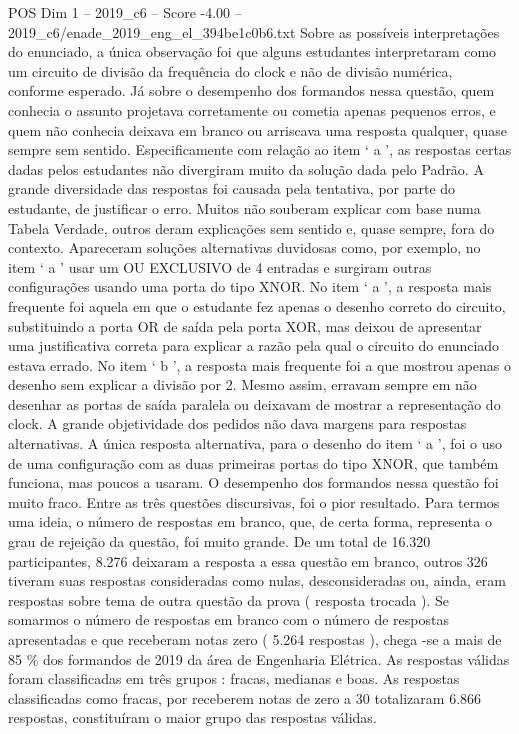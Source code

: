 \begin{textsample}{POS Dim 1 – 2019\_c6 – Score -4.00 – 2019\_c6/enade\_2019\_eng\_el\_394be1c0b6.txt}
Sobre as possíveis interpretações do enunciado, a única observação foi que alguns estudantes interpretaram como um circuito de divisão da frequência do clock e não de divisão numérica, conforme esperado.
Já sobre o desempenho dos formandos nessa questão, quem conhecia o assunto projetava corretamente ou cometia apenas pequenos erros, e quem não conhecia deixava em branco ou arriscava uma resposta qualquer, quase sempre sem sentido.
Especificamente com relação ao item ‘ a ’, as respostas certas dadas pelos estudantes não divergiram muito da solução dada pelo Padrão.
A grande diversidade das respostas foi causada pela tentativa, por parte do estudante, de justificar o erro.
Muitos não souberam explicar com base numa Tabela Verdade, outros deram explicações sem sentido e, quase sempre, fora do contexto.
Apareceram soluções alternativas duvidosas como, por exemplo, no item ‘ a ’ usar um OU EXCLUSIVO de 4 entradas e surgiram outras configurações usando uma porta do tipo XNOR.
No item ‘ a ’, a resposta mais frequente foi aquela em que o estudante fez apenas o desenho correto do circuito, substituindo a porta OR de saída pela porta XOR, mas deixou de apresentar uma justificativa correta para explicar a razão pela qual o circuito do enunciado estava errado.
No item ‘ b ’, a resposta mais frequente foi a que mostrou apenas o desenho sem explicar a divisão por 2.
Mesmo assim, erravam sempre em não desenhar as portas de saída paralela ou deixavam de mostrar a representação do clock.
A grande objetividade dos pedidos não dava margens para respostas alternativas.
A única resposta alternativa, para o desenho do item ‘ a ’, foi o uso de uma configuração com as duas primeiras portas do tipo XNOR, que também funciona, mas poucos a usaram.
O desempenho dos formandos nessa questão foi muito fraco.
Entre as três questões discursivas, foi o pior resultado.
Para termos uma ideia, o número de respostas em branco, que, de certa forma, representa o grau de rejeição da questão, foi muito grande.
De um total de 16.320 participantes, 8.276 deixaram a resposta a essa questão em branco, outros 326 tiveram suas respostas consideradas como nulas, desconsideradas ou, ainda, eram respostas sobre tema de outra questão da prova ( resposta trocada ).
Se somarmos o número de respostas em branco com o número de respostas apresentadas e que receberam notas zero ( 5.264 respostas ), chega -se a mais de 85 \% dos formandos de 2019 da área de Engenharia Elétrica.
As respostas válidas foram classificadas em três grupos : fracas, medianas e boas.
As respostas classificadas como fracas, por receberem notas de zero a 30 totalizaram 6.866 respostas, constituíram o maior grupo das respostas válidas.

\end{textsample}
